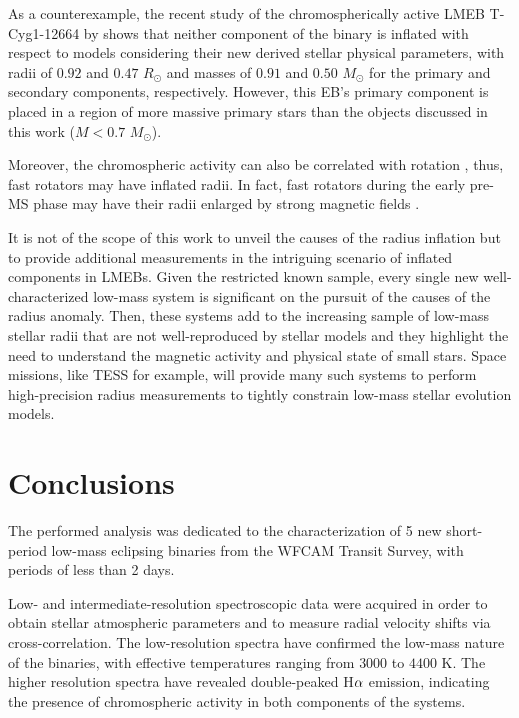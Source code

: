 \documentclass[fleqn,usenatbib]{mnras}
\begin{document}
As a counterexample, the recent study of the chromospherically active LMEB T-Cyg1-12664 by \citet{Han17} shows that neither component of the binary is inflated with respect to models considering their new derived stellar physical parameters, with radii of $0.92$ and $0.47$ $R_{\odot}$ and masses of $0.91$ and $0.50$ $M_{\odot}$ for the primary and secondary components, respectively. However, this EB's primary component is placed in a region of more massive primary stars than the objects discussed in this work ($M < 0.7$ $M_{\odot}$).

Moreover, the chromospheric activity can also be correlated with rotation \citep{Bouvier90}, thus, fast rotators may have inflated radii. In fact, fast rotators during the early pre-MS phase may have their radii enlarged by strong magnetic fields \citep[][and references therein]{Somers14,Barrado16}.

It is not of the scope of this work to unveil the causes of the radius inflation but to provide additional measurements in the intriguing scenario of inflated components in LMEBs. Given the restricted known sample, every single new well-characterized low-mass system is significant on the pursuit of the causes of the radius anomaly. 
Then, these systems add to the increasing sample of low-mass stellar radii that are not well-reproduced by stellar models and they highlight the need to understand the magnetic activity and physical state of small stars. 
Space missions, like TESS for example, will provide many such systems to perform high-precision radius measurements to tightly constrain low-mass stellar evolution models.


\section{Conclusions}

The performed analysis was dedicated to the characterization of 5 new short-period low-mass eclipsing binaries from the WFCAM Transit Survey, with periods of less than 2 days.

Low- and intermediate-resolution spectroscopic data were acquired in order to obtain stellar atmospheric parameters and to measure radial velocity shifts via cross-correlation. The low-resolution spectra have confirmed the low-mass nature of the binaries, with effective temperatures ranging from $3000$ to $4400$ K. The higher resolution spectra have revealed double-peaked H${\rm \alpha}$ emission, indicating the presence of chromospheric activity in both components of the systems.
\end{document}
